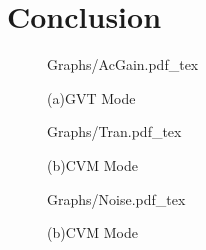 \documentclass{article}
\begin{document}
\section{Conclusion}
\label{sec:conclusion}


\begin{figure}[!hb]
    \begin{minipage}[b]{1\linewidth}
        \centering
        \def\svgwidth{8cm}
        \fontsize{6}{8}\selectfont
         {Graphs/AcGain.pdf_tex}
        \fontsize{8}{10}\selectfont
        \centerline{(a)GVT Mode }\medskip
    \end{minipage}

    \begin{minipage}[!hb]{1\linewidth}
        \centering
        \def\svgwidth{8cm}
        \fontsize{4}{6}\selectfont
         {Graphs/Tran.pdf_tex}
        \fontsize{8}{10}\selectfont
        \centerline{(b)CVM Mode }\medskip
    \end{minipage}

    \begin{minipage}[!hb]{1\linewidth}
        \centering
        \def\svgwidth{8cm}
        \fontsize{6}{8}\selectfont
         {Graphs/Noise.pdf_tex}
        \fontsize{8}{10}\selectfont
        \centerline{(b)CVM Mode }\medskip
    \end{minipage}
    \caption{}
    \label{fig:res}
\end{figure}

%
%
%
%

%
\end{document}
